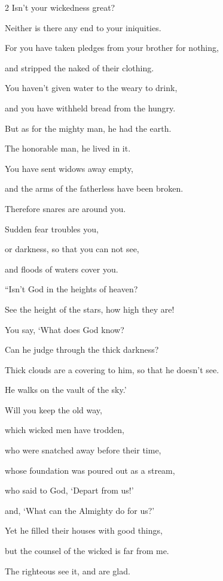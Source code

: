 \begin{multicols}{2}
	\myverse{}Isn’t your wickedness great?
	
	Neither is there any end to your iniquities.
	
	\myverse{}For you have taken pledges from your brother for nothing,
	
	and stripped the naked of their clothing.
	
	\myverse{}You haven’t given water to the weary to drink,
	
	and you have withheld bread from the hungry.
	
	\myverse{}But as for the mighty man, he had the earth.
	
	The honorable man, he lived in it.
	
	\myverse{}You have sent widows away empty,
	
	and the arms of the fatherless have been broken.
	
	\myverse{}Therefore snares are around you.
	
	Sudden fear troubles you,
	
	\myverse{}or darkness, so that you can not see,
	
	and floods of waters cover you.
	
		\vspace{\baselineskip}
	
	
	\myverse{}“Isn’t God in the heights of heaven?
	
	See the height of the stars, how high they are!
	
	\myverse{}You say, ‘What does God know?
	
	Can he judge through the thick darkness?
	
	\myverse{}Thick clouds are a covering to him, so that he doesn’t see.
	
	He walks on the vault of the sky.’
	
	\myverse{}Will you keep the old way,
	
	which wicked men have trodden,
	
	\myverse{}who were snatched away before their time,
	
	whose foundation was poured out as a stream,
	
	\myverse{}who said to God, ‘Depart from us!’
	
	and, ‘What can the Almighty do for us?’
	
	\myverse{}Yet he filled their houses with good things,
	
	but the counsel of the wicked is far from me.
	
	\myverse{}The righteous see it, and are glad.
	

\end{multicols}
